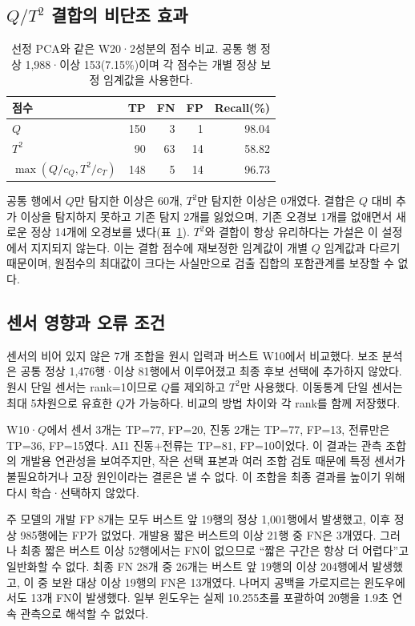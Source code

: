 \documentclass{article}
\begin{document}
\subsection{$Q/T^2$ 결합의 비단조 효과}
\begin{table}[t]
\caption{선정 PCA와 같은 W20·2성분의 점수 비교. 공통 행 정상 1,988·이상 153(7.15\%)이며 각 점수는 개별 정상 보정 임계값을 사용한다.}
\label{tab:scores}\centering\small
\begin{tabular}{lrrrr}\toprule
점수 & TP & FN & FP & Recall(\%)\\\midrule
$Q$ &150&3&1&98.04\\
$T^2$ &90&63&14&58.82\\
$\max(Q/c_Q,T^2/c_T)$ &148&5&14&96.73\\\bottomrule
\end{tabular}
\end{table}

공통 행에서 $Q$만 탐지한 이상은 60개, $T^2$만 탐지한 이상은 0개였다. 결합은 $Q$ 대비 추가 이상을 탐지하지 못하고 기존 탐지 2개를 잃었으며, 기존 오경보 1개를 없애면서 새로운 정상 14개에 오경보를 냈다(표~\ref{tab:scores}). $T^2$와 결합이 항상 유리하다는 가설은 이 설정에서 지지되지 않는다. 이는 결합 점수에 재보정한 임계값이 개별 $Q$ 임계값과 다르기 때문이며, 원점수의 최대값이 크다는 사실만으로 검출 집합의 포함관계를 보장할 수 없다.

\subsection{센서 영향과 오류 조건}
센서의 비어 있지 않은 7개 조합을 원시 입력과 버스트 W10에서 비교했다. 보조 분석은 공통 정상 1,476행·이상 81행에서 이루어졌고 최종 후보 선택에 추가하지 않았다. 원시 단일 센서는 rank=1이므로 $Q$를 제외하고 $T^2$만 사용했다. 이동통계 단일 센서는 최대 5차원으로 유효한 $Q$가 가능하다. 비교의 방법 차이와 각 rank를 함께 저장했다.

W10·$Q$에서 센서 3개는 TP=77, FP=20, 진동 2개는 TP=77, FP=13, 전류만은 TP=36, FP=15였다. AI1 진동+전류는 TP=81, FP=10이었다. 이 결과는 관측 조합의 개발용 연관성을 보여주지만, 작은 선택 표본과 여러 조합 검토 때문에 특정 센서가 불필요하거나 고장 원인이라는 결론은 낼 수 없다. 이 조합을 최종 결과를 높이기 위해 다시 학습·선택하지 않았다.

주 모델의 개발 FP 8개는 모두 버스트 앞 19행의 정상 1,001행에서 발생했고, 이후 정상 985행에는 FP가 없었다. 개발용 짧은 버스트의 이상 21행 중 FN은 3개였다. 그러나 최종 짧은 버스트 이상 52행에서는 FN이 없으므로 ``짧은 구간은 항상 더 어렵다''고 일반화할 수 없다. 최종 FN 28개 중 26개는 버스트 앞 19행의 이상 204행에서 발생했고, 이 중 보완 대상 이상 19행의 FN은 13개였다. 나머지 공백을 가로지르는 윈도우에서도 13개 FN이 발생했다. 일부 윈도우는 실제 10.255초를 포괄하여 20행을 1.9초 연속 관측으로 해석할 수 없었다.
\end{document}
